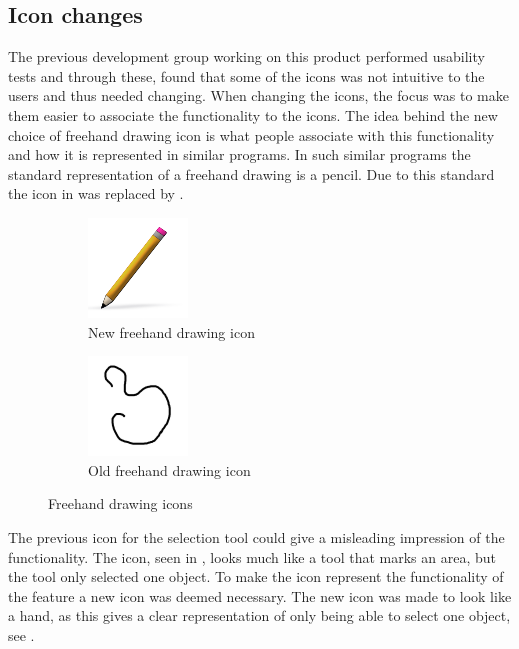 \subsection{Icon changes}
The previous development group working on this product \citep{misc:crocold} performed usability tests and through these, found that some of the icons was not intuitive to the users and thus needed changing.
When changing the icons, the focus was to make them easier to associate the functionality to the icons.
The idea behind the new choice of freehand drawing icon is what people associate with this functionality and how it is represented in similar programs.
In such similar programs the standard representation of a freehand drawing is a pencil.
Due to this standard the icon in  was replaced by .

\begin{figure}[h]
	\centering
	\begin{subfigure}[b]{0.45\textwidth}
		\centering
		\includegraphics[scale = 1]{media/freehandNew}
		\caption{New freehand drawing icon}
		\label{figure:new-freehand}
	\end{subfigure}
	\qquad
	\begin{subfigure}[b]{0.45\textwidth}
		\centering
		\includegraphics[scale = 0.1]{media/freehandOld}
		\caption{Old freehand drawing icon}
		\label{figure:old-freehand}
	\end{subfigure}
	\caption{Freehand drawing icons}
	\label{figure:freehand}
\end{figure}

The previous icon for the selection tool could give a misleading impression of the functionality.
The icon, seen in , looks much like a tool that marks an area, but the tool only selected one object.
To make the icon represent the functionality of the feature a new icon was deemed necessary.
The new icon was made to look like a hand, as this gives a clear representation of only being able to select one object, see .

